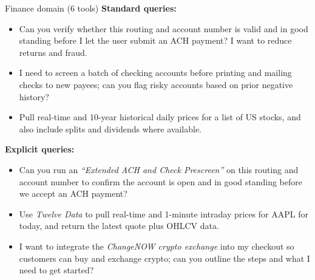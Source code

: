 \begin{examplebox}{Finance domain (6 tools)}
\textbf{Standard queries:}
\begin{itemize}\setlength{\itemsep}{1pt}
    \item Can you verify whether this routing and account number is
    valid and in good standing before I let the user submit an ACH
    payment? I want to reduce returns and fraud.
    \item I need to screen a batch of checking accounts before printing
    and mailing checks to new payees; can you flag risky accounts based
    on prior negative history?
    \item Pull real-time and 10-year historical daily prices for a list
    of US stocks, and also include splits and dividends where available.
\end{itemize}

\smallskip
\textbf{Explicit queries:}
\begin{itemize}\setlength{\itemsep}{1pt}
    \item Can you run an \emph{``Extended ACH and Check Prescreen''} on
    this routing and account number to confirm the account is open and
    in good standing before we accept an ACH payment?
    \item Use \emph{Twelve Data} to pull real-time and 1-minute intraday
    prices for AAPL for today, and return the latest quote plus OHLCV
    data.
    \item I want to integrate the \emph{ChangeNOW crypto exchange} into
    my checkout so customers can buy and exchange crypto; can you
    outline the steps and what I need to get started?
\end{itemize}
\end{examplebox}

